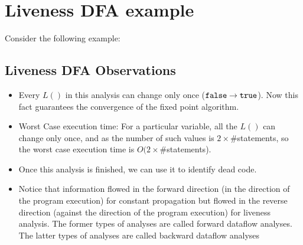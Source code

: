\setlength{\parindent}{0pt}
\clearpage

\section{Liveness DFA example}

Consider the following example:

    
 

\subsection{Liveness DFA Observations}
\begin{itemize}
    \item Every $L()$ in this analysis can change only once (${\tt false} \rightarrow {\tt true}$). Now this fact guarantees the convergence of the fixed point algorithm.
    \item Worst Case execution time: For a particular variable, all the $L()$ can change only once, and as the number of such values is $2 \times \#$statements, so the worst case execution time is $O(2 \times \#$statements).
    \item Once this analysis is finished, we can use it to identify dead code.
    \item Notice that information flowed in the forward direction (in the direction of the program execution) for constant propagation but flowed in the reverse direction (against the direction of the program execution) for liveness analysis.
    The former types of analyses are called forward dataflow analyses. The latter types of analyses are called backward dataflow analyses
\end{itemize}